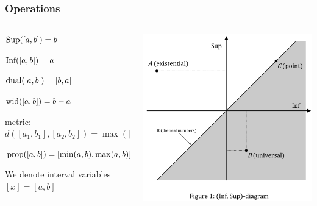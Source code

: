 \documentclass{beamer}
\begin{document}

\begin{frame}
    \frametitle{Operations}

    \begin{columns}[T]
        \begin{column}{.5\textwidth}
            $\text{Sup}([a, b]) = b$
            \par $\text{Inf}([a, b]) = a$
            \par $\text{dual}([a, b]) = [b, a]$
            \par $\text{wid}([a, b]) = b - a$

            \vspace{7mm}
            \par metric: $d([a_1, b_1], [a_2, b_2]) = \max(|a_1 - a_2|, |b_1 - b_2|)$

            \vspace{7mm}
            $\text{prop}([a, b]) = [\min(a, b), \max(a, b)]$
            
            \vspace{7mm}
            \par We denote interval variables $[x] = [a, b]$

        \end{column}
        \begin{column}{.5\textwidth}
            \includegraphics[scale=0.3]{inf-sup-diagram.png}

        \end{column}
    \end{columns}

\end{frame}
\end{document}
